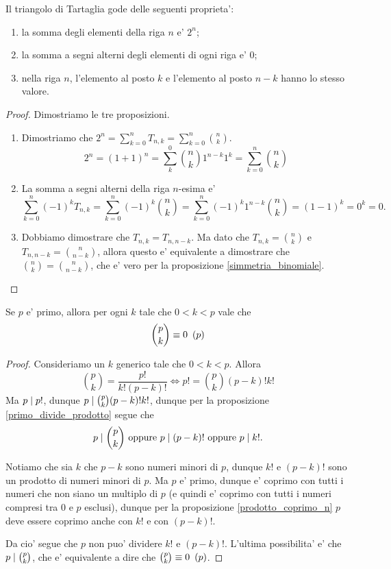 \begin{proposition}
    Il triangolo di Tartaglia gode delle seguenti proprieta':
    \begin{enumerate}
        \item la somma degli elementi della riga $n$ e' $2^n$;
        \item la somma a segni alterni degli elementi di ogni riga e' $0$;
        \item nella riga $n$, l'elemento al posto $k$ e l'elemento al posto $n-k$ hanno lo stesso valore.
    \end{enumerate}
\end{proposition}
\begin{proof}
    Dimostriamo le tre proposizioni.
    \begin{enumerate}
        \item Dimostriamo che $2^n = \sum_{k=0}^n T_{n, k} = \sum_{k=0}^n \binom{n}{k}$.
        \[2^n = (1+1)^n = \sum_k^0 \binom{n}{k}1^{n-k}1^k = \sum_{k=0}^n \binom{n}{k}\]
        \item La somma a segni alterni della riga $n$-esima e' \[\sum_{k=0}^n (-1)^kT_{n, k} = \sum_{k=0}^n (-1)^k\binom{n}{k} = \sum_{k=0}^n (-1)^k1^{n-k}\binom{n}{k} = (1-1)^k = 0^k = 0.\]
        \item Dobbiamo dimostrare che $T_{n, k} = T_{n, n-k}$. Ma dato che $T_{n, k} = \binom{n}{k}$ e $T_{n, n-k} = \binom{n}{n-k}$, allora questo e' equivalente a dimostrare che $\binom{n}{k} = \binom{n}{n-k}$, che e' vero per la proposizione \ref{simmetria_binomiale}. \qedhere
    \end{enumerate}
\end{proof}

\begin{proposition}\label{binomio_pk_divisibile_p}
    Se $p$ e' primo, allora per ogni $k$ tale che $0 < k < p$ vale che
    \begin{equation}
        \binom{p}{k} \equiv 0 \ \left(p\right)
    \end{equation}
\end{proposition}
\begin{proof}
    Consideriamo un $k$ generico tale che $0 < k < p$.
    Allora \[
        \binom{p}{k} = \frac{p!}{k!(p-k)!} \iff p! = \binom{p}{k}(p-k)!k!    
    \]
    Ma $p \mid p!$, dunque $p \mid \binom{p}{k}(p-k)!k!$, dunque per la proposizione \ref{primo_divide_prodotto} segue che \[
        p \mid \binom{p}{k} \text{ oppure } p \mid (p-k)! \text{ oppure } p \mid k!
    .\]

    Notiamo che sia $k$ che $p-k$ sono numeri minori di $p$, dunque $k!$ e $(p-k)!$ sono un prodotto di numeri minori di $p$. Ma $p$ e' primo, dunque e' coprimo con tutti i numeri che non siano un multiplo di $p$ (e quindi e' coprimo con tutti i numeri compresi tra $0$ e $p$ esclusi), dunque per la proposizione \ref{prodotto_coprimo_n} $p$ deve essere coprimo anche con $k!$ e con $(p-k)!$. 
    
    Da cio' segue che $p$ non puo' dividere $k!$ e $(p-k)!$.
    L'ultima possibilita' e' che $p \mid \binom{p}{k}$, che e' equivalente a dire che $\binom{p}{k} \equiv 0 \ \left(p\right)$.
\end{proof}

